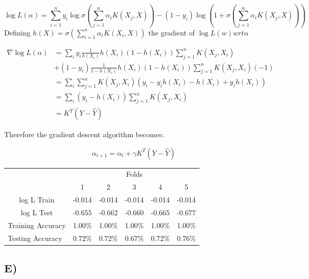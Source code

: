 \documentclass{report}
\begin{document}
\begin{equation}
  \log L(\alpha) =
  \sum_{i=1}^{n} y_i
  \log
  \sigma(\sum_{j=1}^{n}\alpha_iK(X_j,X))
  -
  (1-y_i)
  \log
  (1+\sigma(\sum_{j=1}^{n}\alpha_iK(X_j,X)))
\end{equation}
Defining $h(X)=\sigma(\sum_{i=1}^{n}\alpha_i K(X_i,X))$ the gradient of $\log L(w) wrt \alpha$

\begin{equation}
  \begin{aligned}
    \nabla
    \log L(\alpha) &=
    \sum_i y_i
    \frac{1}{h(X_i)}
    h(X_i)
    (1-h(X_i))
    \sum_{j=1}^{n}K(X_j,X_i)\\
    &+
    (1-y_i)
    \frac{1}{1-h(X_i)}
    h(X_i)
    (1-h(X_i))
    \sum_{j=1}^{n}K(X_j,X_i)
    (-1)\\
    &=\sum_i
    \sum_{j=1}^{n}K(X_j,X_i)
    (y_i-y_ih(X_i)-h(X_i)+y_ih(X_i))\\
    &=\sum_i(y_i - h(X_i))\sum_{j=1}^{n}K(X_j,X_i)\\
    &=K^T(Y-\hat{Y})
  \end{aligned}
\end{equation}

Therefore the gradient descent algorithm becomes:

\begin{equation}
    \alpha_{t+1} = \alpha_t + \gamma K^T(Y - \hat{Y})
\end{equation}


\begin{table}[h]
 \begin{tabular}{l|c|c|c|c|c|}
 \cline{2-6}
     & \multicolumn{5}{c|}{Folds}      \\ \cline{2-6}
     &  1  &  2  &  3  &  4  &  5 \\ \hline
\multicolumn{1}{|c|}{log L Train} & -0.014 & -0.014 & -0.014 & -0.014 & -0.014  \\ \hline
\multicolumn{1}{|c|}{log L Test} & -0.655 & -0.662 & -0.660 & -0.665 & -0.677  \\ \hline
\multicolumn{1}{|l|}{Training Accuracy} & 1.00\% & 1.00\% & 1.00\% & 1.00\% & 1.00\% \\ \hline
\multicolumn{1}{|l|}{Testing Accuracy} & 0.72\% & 0.72\% & 0.67\% & 0.72\% & 0.76\% \\ \hline
\end{tabular}
\end{table}
\subsection*{E)}
\end{document}
